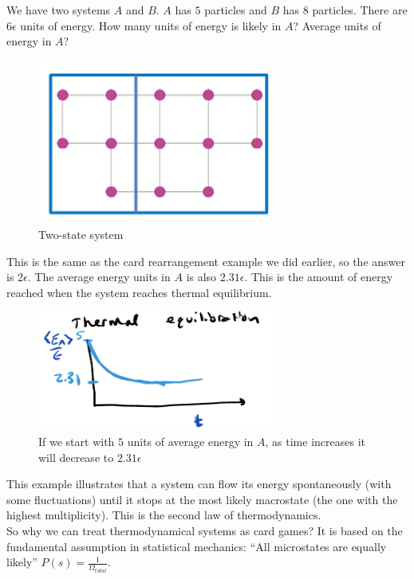 \documentclass[12pt, a4paper]{article}
\newcounter{exa}
\begin{document}
\begin{texample}
We have two systems $A$ and $B$. $A$ has $5$ particles and $B$ has $8$ particles. There are $6\epsilon$ units of energy. How many units of energy is likely in $A$? Average units of energy in $A$? \\

\begin{figure}[H]
\centering
\includegraphics[width=80mm]{7.png}
\caption{Two-state system}
\end{figure}

This is the same as the card rearrangement example we did earlier, so the answer is $2\epsilon$. The average energy units in $A$ is also $2.31\epsilon$. This is the amount of energy reached when the system reaches thermal equilibrium.

\begin{figure}[H]
\centering
\includegraphics[width=80mm]{10.png}
\caption{If we start with $5$ units of average energy in $A$, as time increases it will decrease to $2.31\epsilon$}
\end{figure}

This example illustrates that a system can flow its energy spontaneously (with some fluctuations) until it stops at the most likely macrostate (the one with the highest multiplicity). This is the second law of thermodynamics. \\

So why we can treat thermodynamical systems as card games? It is based on the fundamental assumption in statistical mechanics: ``All microstates are equally likely'' $P(s)=\frac{1}{\Omega_{total}}$.
\end{texample}
\end{document}
